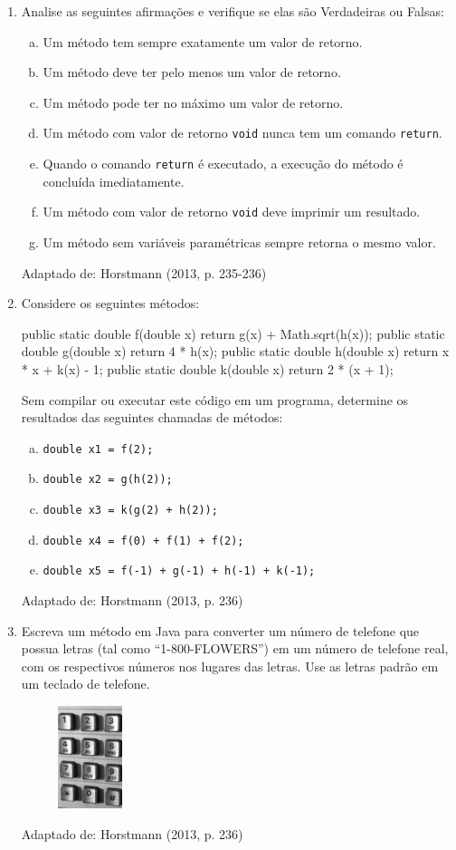 \documentclass[onecolumn,a4paper,10pt]{report}
\newcommand{\+}{\, + \,}
\newcommand{\<}{\hspace*{-0.4cm}}
\begin{document}
\begin{enumerate}
\item Analise as seguintes afirmações e verifique se elas são Verdadeiras ou Falsas:
\begin{enumerate}[a.]
	\item Um método tem sempre exatamente um valor de retorno.
	\item Um método deve ter pelo menos um valor de retorno.
	\item Um método pode ter no máximo um valor de retorno.
	\item Um método com valor de retorno \texttt{void} nunca tem um comando \texttt{return}.
	\item Quando o comando \texttt{return} é executado, a execução do método é concluída imediatamente.
	\item Um método com valor de retorno \texttt{void} deve imprimir um resultado.
	\item Um método sem variáveis paramétricas sempre retorna o mesmo valor.
\end{enumerate}
{\tiny Adaptado de: Horstmann (2013, p. 235-236)}

\newpage
\item Considere os seguintes métodos:
\begin{javacode}
public static double f(double x) { return g(x) + Math.sqrt(h(x)); }
public static double g(double x) { return 4 * h(x); }
public static double h(double x) { return x * x + k(x) - 1; }
public static double k(double x) { return 2 * (x + 1); }
\end{javacode}
Sem compilar ou executar este código em um programa, determine os resultados das seguintes chamadas de métodos:
\begin{enumerate}[a.]
	\item \texttt{double x1 = f(2);}
	\item \texttt{double x2 = g(h(2));}
	\item \texttt{double x3 = k(g(2) + h(2));}
	\item \texttt{double x4 = f(0) + f(1) + f(2);}
	\item \texttt{double x5 = f(-1) + g(-1) + h(-1) + k(-1);}
\end{enumerate}
{\tiny Adaptado de: Horstmann (2013, p. 236)}

\item Escreva um método em Java para converter um número de telefone que possua letras (tal como ``1-800-FLOWERS'') em um número de telefone real, com os respectivos números nos lugares das letras. Use as letras padrão em um teclado de telefone.
\begin{figure}[H]
	\includegraphics[height=3cm,center]{pucrs-ep-fprog-unidade_05-metodos-lista_de_exercicios-teclado.jpg}
\end{figure}
{\tiny Adaptado de: Horstmann (2013, p. 236)}


\end{enumerate}
\end{document}
